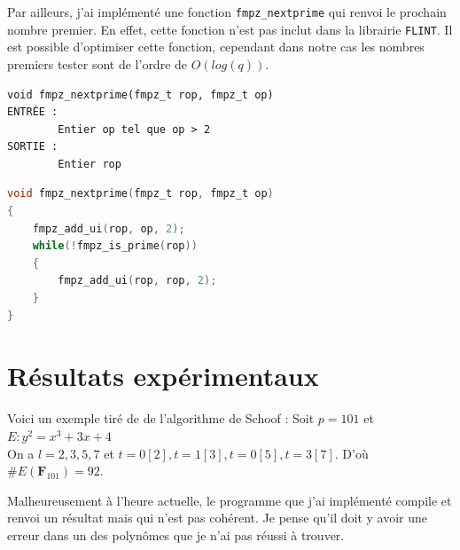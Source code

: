 \documentclass{article}%
\theoremstyle{plain}
\theoremstyle{definition}
\theoremstyle{plain}
\theoremstyle{plain}
\theoremstyle{remark}
\begin{document}
Par ailleurs, j'ai implémenté une fonction \verb|fmpz_nextprime| qui renvoi le prochain nombre premier. 
En effet, cette fonction n'est pas inclut dans la librairie \verb|FLINT|. Il est possible d'optimiser cette fonction, cependant dans notre cas les nombres premiers tester sont de l'ordre de $O(log(q))$.
 
\begin{verbatim}
void fmpz_nextprime(fmpz_t rop, fmpz_t op)
ENTRÉE :
    	Entier op tel que op > 2
SORTIE :
    	Entier rop
\end{verbatim} 
\begin{lstlisting}[language=c]
void fmpz_nextprime(fmpz_t rop, fmpz_t op)
{
    fmpz_add_ui(rop, op, 2);
    while(!fmpz_is_prime(rop))
    {
        fmpz_add_ui(rop, rop, 2);
    }
}
\end{lstlisting}

\section{Résultats expérimentaux}


Voici un exemple tiré de \cite{ref2} de l'algorithme de Schoof : Soit $p=101$ et $E : y^{2} = x^{3} + 3x + 4$\\
On a $l = 2, 3, 5, 7$ et $t=0[2], t=1[3], t=0[5], t=3[7]$.
D'où $\#E(\mathbf{F}_{101}) = 92$.

Malheureusement à l'heure actuelle, le programme que j'ai implémenté compile et renvoi un résultat mais qui n'est pas cohérent.
Je pense qu'il doit y avoir une erreur dans un des polynômes que je n'ai pas réussi à trouver.

\clearpage 
\nocite{*} 


\end{document}
